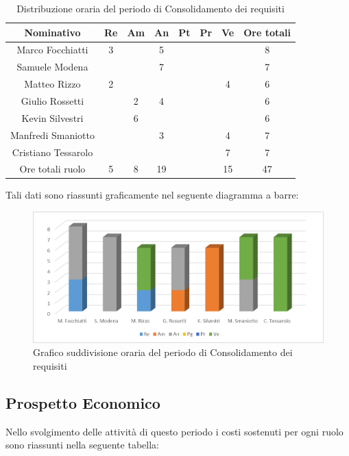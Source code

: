 \documentclass[./PianodiProgetto.tex]{subfiles}
\begin{document}
\begin{table}[H]
	\centering
	\begin{tabular}{|c|cccccc|c|}
		\hline
		Nominativo&Re&Am&An&Pt&Pr&Ve&Ore totali\\ \hline
		Marco Focchiatti&3& &5& & & &8 \\ \hline
		Samuele Modena& & &7& & & &7 \\ \hline
		Matteo Rizzo&2& & & & &4&6 \\ \hline
		Giulio Rossetti& &2&4& & & &6 \\ \hline
		Kevin Silvestri& &6& & & & &6 \\ \hline
		Manfredi Smaniotto& & &3& & &4&7 \\ \hline
		Cristiano Tessarolo& & & & & &7&7 \\  \hline
		Ore totali ruolo&5&8&19& & &15&47 \\ \hline
	\end{tabular}
	\caption{Distribuzione oraria del periodo di Consolidamento dei requisiti}
\end{table}

Tali dati sono riassunti graficamente nel seguente diagramma a barre:
\begin{figure}[H]
	\centering
	\includegraphics[width=1\linewidth]{img/grafici/ConsolidamentoRequisitiProspettoOrario}
	\caption{Grafico suddivisione oraria del periodo di Consolidamento dei requisiti}
	\label{fig:consolidamento-requisiti-prospetto-orario}
\end{figure}

\subsection{Prospetto Economico}
Nello svolgimento delle attività di questo periodo i costi sostenuti per ogni ruolo sono riassunti nella seguente tabella:
\end{document}
